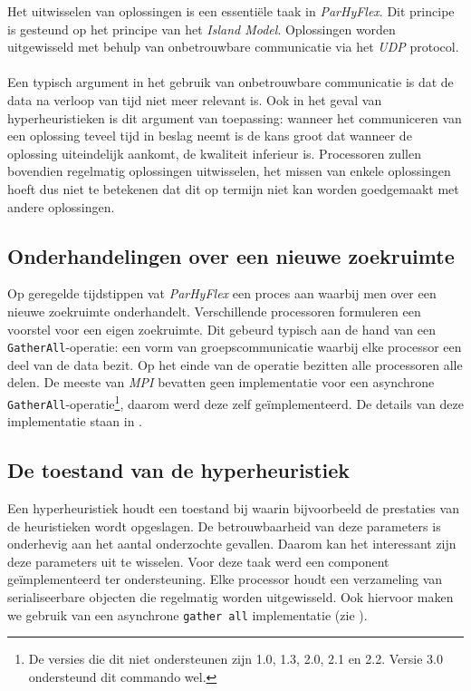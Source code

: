 Het uitwisselen van oplossingen is een essenti\"ele taak in \emph{ParHyFlex}. Dit principe is gesteund op het principe van het \emph{Island Model}\cite{parallelgeneticalgorithms}. Oplossingen worden uitgewisseld met behulp van onbetrouwbare communicatie via het \emph{UDP} protocol.

\paragraph{}
Een typisch argument in het gebruik van onbetrouwbare communicatie is dat de data na verloop van tijd niet meer relevant is. Ook in het geval van hyperheuristieken is dit argument van toepassing: wanneer het communiceren van een oplossing teveel tijd in beslag neemt is de kans groot dat wanneer de oplossing uiteindelijk aankomt, de kwaliteit inferieur is. Processoren zullen bovendien regelmatig oplossingen uitwisselen, het missen van enkele oplossingen hoeft dus niet te betekenen dat dit op termijn niet kan worden goedgemaakt met andere oplossingen.

\subsection{Onderhandelingen over een nieuwe zoekruimte}

Op geregelde tijdstippen vat \emph{ParHyFlex} een proces aan waarbij men over een nieuwe zoekruimte onderhandelt. Verschillende processoren formuleren een voorstel voor een eigen zoekruimte. Dit gebeurd typisch aan de hand van een \texttt{GatherAll}-operatie: een vorm van groepscommunicatie waarbij elke processor een deel van de data bezit. Op het einde van de operatie bezitten alle processoren alle delen. De meeste van \emph{MPI} bevatten geen implementatie voor een asynchrone \texttt{GatherAll}-operatie\footnote{De versies die dit niet ondersteunen zijn 1.0\cite{mpi10}, 1.3\cite{mpi13}, 2.0\cite{conf/europar/GeistGHLLSSS96,mpi20}, 2.1\cite{mpi21} en 2.2\cite{mpi22}. Versie 3.0\cite{mpi30} ondersteund dit commando wel.}, daarom werd deze zelf ge\"implementeerd. De details van deze implementatie staan in .

\subsection{De toestand van de hyperheuristiek}

Een hyperheuristiek houdt een toestand bij waarin bijvoorbeeld de prestaties van de heuristieken wordt opgeslagen. De betrouwbaarheid van deze parameters is onderhevig aan het aantal onderzochte gevallen. Daarom kan het interessant zijn deze parameters uit te wisselen. Voor deze taak werd een component ge\"implementeerd ter ondersteuning. Elke processor houdt een verzameling van serialiseerbare objecten die regelmatig worden uitgewisseld. Ook hiervoor maken we gebruik van een asynchrone \texttt{gather all} implementatie (zie ).